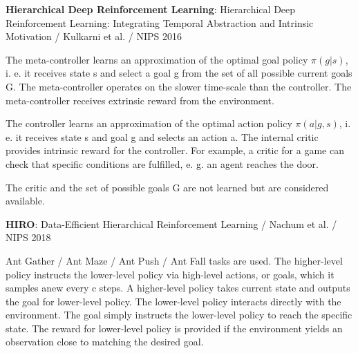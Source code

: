 \documentclass{article}
\begin{document}
\textbf{Hierarchical Deep Reinforcement Learning}: Hierarchical Deep Reinforcement Learning: Integrating Temporal Abstraction and Intrinsic Motivation / Kulkarni et al. / NIPS 2016

The meta-controller learns an approximation of the optimal goal policy $\pi(g|s)$, i. e. it receives state s and select a goal g from the set of all possible current goals G. The meta-controller operates on the slower time-scale than the controller. The meta-controller receives extrinsic reward from the environment.

The controller learns an approximation of the optimal action policy $\pi(a|g,s)$, i. e. it receives state s and goal g and selects an action a. The internal critic provides intrinsic reward for the controller. For example, a critic for a game can check that specific conditions are fulfilled, e. g. an agent reaches the door.

The critic and the set of possible goals G are not learned but are considered available.

\textbf{HIRO}: Data-Efficient Hierarchical Reinforcement Learning / Nachum et al. / NIPS 2018

Ant Gather / Ant Maze / Ant Push / Ant Fall tasks are used. The higher-level policy instructs the lower-level policy via high-level actions, or goals, which it samples anew every c steps. A higher-level policy takes current state and outputs the goal for lower-level policy. The lower-level policy interacts directly with the environment. The goal simply instructs the lower-level policy to reach the specific state. The reward for lower-level policy is provided if the environment yields an observation close to matching the desired goal.
\end{document}
